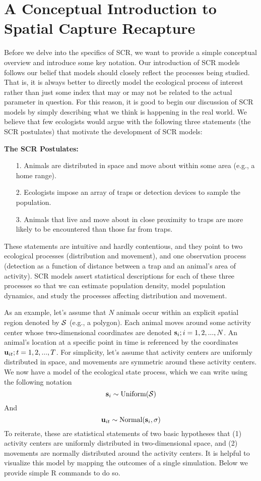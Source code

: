 \section{A Conceptual Introduction to Spatial Capture Recapture}

Before we delve into the specifics of SCR, we want to provide a simple
conceptual overview and introduce some key notation. Our introduction
of SCR models follows our belief that models should closely reflect
the processes being studied. That is, it is always better to directly
model the ecological process of interest rather than just some index
that may or may not be related to the actual parameter in
question. For this reason, it is good to begin our discussion of SCR
models by simply describing what we think is happening in the real
world. We believe that few ecologists would argue with the following
three statements (the SCR postulates) that motivate the development of
SCR models:

{\bf The SCR Postulates:}
\begin{itemize}
\item[1.] Animals are distributed in space and move about within some area (e.g., a home range).
\item[2.] Ecologists impose an array of traps or detection devices to sample the population. 
\item[3.] Animals that live and move about in close proximity to traps are more likely to be encountered than those far from traps.
\end{itemize}

These statements are intuitive and hardly contentious, and they point
to two ecological processes (distribution and movement), and one
observation process (detection as a function of distance between a
trap and an animal's area of activity). SCR models assert statistical
descriptions for each of these three processes so that we can estimate
population density, model population dynamics, and study the processes
affecting distribution and movement.

As an example, let's assume that $N$ animals occur within an explicit
spatial region denoted by ${\cal S}$
(e.g., a polygon).  Each animal moves around some activity center
whose two-dimensional coordinates are denoted ${\bf s}_i;
i=1,2,...,N$. An animal's location at a specific point in time is
referenced by the coordinates ${\bf u}_{it}; t=1,2,...,T$. For
simplicity, let's assume that activity centers are uniformly
distributed in space, and movements are symmetric around these
activity centers. We now have a model of the ecological state process,
which we can write using the following notation
\[
{\bf s}_{i} \sim \mbox{Uniform}({\cal S})
\]
And
\[
{\bf u}_{it} \sim \mbox{Normal}({\bf s}_{i}, \sigma)
\]
To reiterate, these are statistical statements of two basic hypotheses
that (1) activity centers are uniformly distributed in two-dimensional
space, and (2) movements are normally distributed around the activity
centers. It is helpful to visualize this model by mapping the outcomes
of a single simulation. Below we provide simple R commands to do so.

